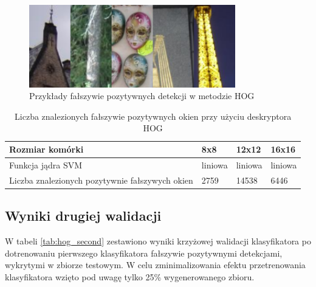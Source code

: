 \begin{figure}[htb]
\centering
\includegraphics[width=0.8\textwidth]{hog_fps.png}
\caption{Przykłady fałszywie pozytywnych detekcji w metodzie HOG}
\label{fig:fp_hog}
\end{figure}

\begin{center}
    \begin{longtable}{ | p{5cm} | p{3cm} | p{3cm} | p{3cm} |}
    \caption{Liczba znalezionych fałszywie pozytywnych okien przy użyciu deskryptora HOG} \\
    \hline
	Rozmiar komórki & 8x8 & 12x12 & 16x16 \\ \hline
	Funkcja jądra SVM & liniowa & liniowa & liniowa  \\ \hline
    Liczba znalezionych pozytywnie fałszywych okien & 2759 & 14538 & 6446 \\ \hline
    \end{longtable}
    \label{tab:fp_hog}
\end{center}

\subsection{Wyniki drugiej walidacji}

W tabeli \ref{tab:hog_second} zestawiono wyniki krzyżowej walidacji klasyfikatora po dotrenowaniu pierwszego klasyfikatora fałszywie pozytywnymi detekcjami, wykrytymi w zbiorze testowym. W celu zminimalizowania efektu przetrenowania klasyfikatora wzięto pod uwagę tylko 25\% wygenerowanego zbioru.

